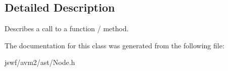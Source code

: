 \subsection{Detailed Description}
Describes a call to a function / method. 

The documentation for this class was generated from the following file\+:\begin{DoxyCompactItemize}
\item 
jswf/avm2/ast/Node.\+h\end{DoxyCompactItemize}
